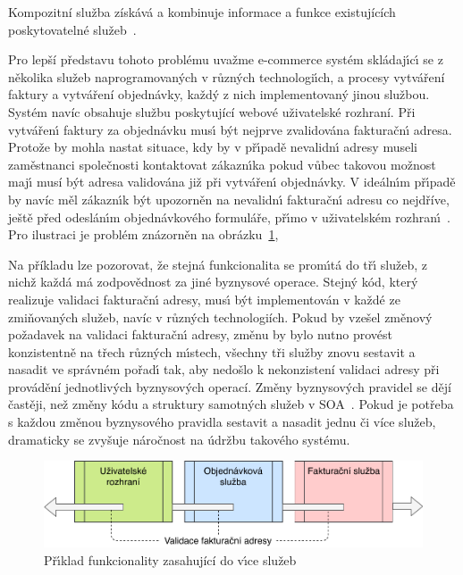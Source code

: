 \begin{definition}
    Kompozitní služba získává a kombinuje informace a funkce existujících poskytovatelné
    služeb~\cite{papazoglou2003service}.
\end{definition}

Pro lepší představu tohoto problému uvažme e-commerce systém
skládaj\'{\i}c\'{\i} se z několika služeb naprogramovan\'ych v různ\'ych technologi\'{\i}ch,
a procesy vytváření faktury a vytváření objednávky, každý z nich implementovaný jinou službou.
Systém navíc obsahuje službu poskytující webové uživatelské rozhraní.
Při vytvářen\'{\i} faktury za objednávku mus\'{\i} b\'yt nejprve zvalidována fakturačn\'{\i} adresa.
Protože by mohla nastat situace, kdy by v př\'{\i}padě nevalidn\'{\i} adresy museli zaměstnanci
společnosti kontaktovat zákazn\'{\i}ka \textendash\xspace pokud vůbec takovou možnost maj\'{\i}
\textendash\xspace musí být adresa validována již při vytvářen\'{\i} objednávky.
V ideáln\'{\i}m př\'{\i}padě by navíc měl zákazn\'{\i}k být upozorněn na nevalidn\'{\i} fakturačn\'{\i}
adresu co nejdříve, ještě před odeslán\'{\i}m objednávkového formuláře, př\'{\i}mo v uživatelském
rozhran\'{\i}~\cite{cemus2017separation}. Pro ilustraci je problém znázorněn na obrázku~\ref{fig:service-cutting},

Na příkladu lze pozorovat, že stejná funkcionalita se prom\'{\i}tá
do tř\'{\i} služeb, z nichž každá má zodpovědnost za jiné byznysové operace.
Stejn\'y kód, kter\'y realizuje validaci fakturačn\'{\i} adresy,
mus\'{\i} b\'yt implementován v každé ze zmiňovaných služeb, navíc v různých technologiích.
Pokud by vzešel změnový požadavek na validaci fakturačn\'{\i} adresy, změnu by bylo nutno
provést konzistentně na třech různ\'ych m\'{\i}stech, všechny tři služby znovu
sestavit a nasadit ve správném pořad\'{\i} tak, aby nedošlo k nekonzistení validaci adresy
při provádění jednotlivých byznysových operací. Změny byznysových pravidel se dějí častěji,
než změny kódu a struktury samotných služeb v \gls{SOA}~\cite{rosenberg2005business}.
Pokud je potřeba s každou změnou byznysového pravidla sestavit a nasadit jednu či více služeb,
dramaticky se zvyšuje náročnost na údržbu takového systému.

\begin{figure}
    \centering
    \includegraphics[keepaspectratio=true, width=0.8\linewidth]{figures/service-cutting.pdf}
    \caption{Př\'{\i}klad funkcionality zasahující do v\'{\i}ce služeb}
    \label{fig:service-cutting}
\end{figure}

